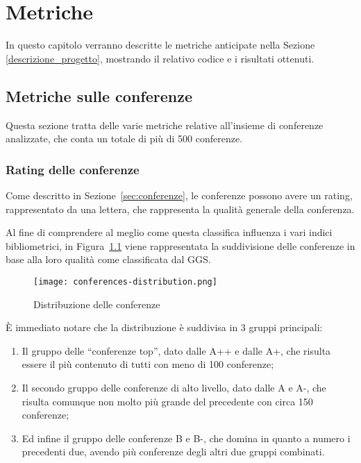 \chapter{Metriche}

In questo capitolo verranno descritte le metriche anticipate nella Sezione
\ref{descrizione_progetto}, mostrando il relativo codice e i risultati ottenuti.

\section{Metriche sulle conferenze}

Questa sezione tratta delle varie metriche relative all'insieme di conferenze
analizzate, che conta un totale di più di 500 conferenze.

\subsection{Rating delle conferenze}

Come descritto in Sezione~\ref{sec:conferenze}, le conferenze possono avere
un rating, rappresentato da una lettera, che rappresenta la qualità generale
della conferenza.

Al fine di comprendere al meglio come questa classifica influenza i vari indici
bibliometrici, in Figura~\ref{fig:conferences-distribution} viene rappresentata
la suddivisione delle conferenze in base alla loro qualità come classificata
dal GGS.

\begin{figure}[tb]
  \centering
  \texttt{[image: conferences-distribution.png]}
  \caption{Distribuzione delle conferenze}
  \label{fig:conferences-distribution}
\end{figure}

È immediato notare che la distribuzione è suddivisa in 3 gruppi principali:
\begin{enumerate}
  \item Il gruppo delle ``conferenze top'', dato dalle A++ e dalle A+, che
        risulta essere il più contenuto di tutti con meno di 100 conferenze;
  \item Il secondo gruppo delle conferenze di alto livello, dato dalle A e A-,
        che risulta comunque non molto più grande del precedente con circa 150
        conferenze;
  \item Ed infine il gruppo delle conferenze B e B-, che domina in quanto a numero
        i precedenti due, avendo più conferenze degli altri due gruppi combinati.
\end{enumerate}

